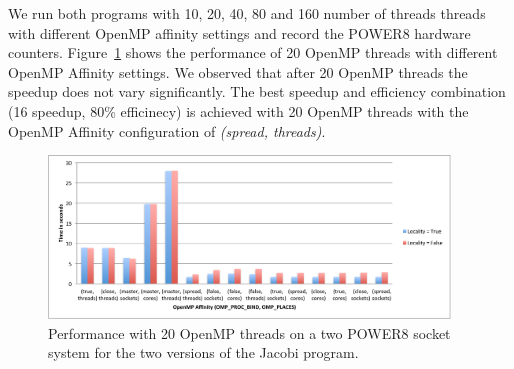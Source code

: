  We run both programs with 10, 20, 40, 80 and 160  number of threads threads with different OpenMP affinity settings and record the POWER8 hardware counters.
 Figure~\ref{fig:20th} shows the performance of 20 OpenMP threads with different OpenMP Affinity settings. We observed that after 20 OpenMP threads the speedup does not vary significantly. The best speedup and efficiency combination (16 speedup, 80\% efficinecy) is achieved with 20 OpenMP threads with the OpenMP Affinity configuration of \textit{(spread, threads)}.
%
\begin{figure}[h!]
  \centering
  \includegraphics[height=0.4\textwidth, width=0.95\textwidth]{./Images/20Perf.pdf}
       \caption{Performance with 20 OpenMP threads on a two POWER8 socket system for the two versions of the Jacobi program.}
       \label{fig:20th}
\end{figure}
%
